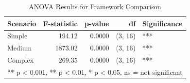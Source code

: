 \begin{table}[htbp]
\centering
\caption{ANOVA Results for Framework Comparison}
\label{tab:anova}
\begin{tabular}{lrrrl}
\toprule
\textbf{Scenario} & \textbf{F-statistic} & \textbf{p-value} & \textbf{df} & \textbf{Significance} \\
\midrule
Simple   &   194.12 & 0.0000 & (3, 16) & *** \\
Medium   &  1873.02 & 0.0000 & (3, 16) & *** \\
Complex  &   269.35 & 0.0000 & (3, 16) & *** \\
\bottomrule
\multicolumn{5}{l}{\footnotesize *** p < 0.001, ** p < 0.01, * p < 0.05, ns = not significant} \\
\end{tabular}
\end{table}